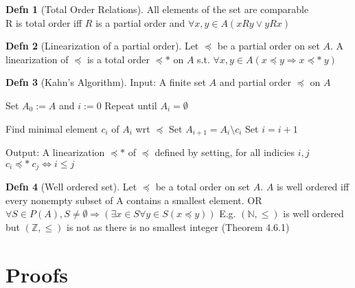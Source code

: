 \documentclass[a4paper]{article}
\theoremstyle{definition}
\newtheorem*{defn}{Defn}
\begin{document}
\begin{defn}[Total Order Relations] All elements of the set are comparable\\
  R is total order iff $R$ is a partial order and $\forall x, y \in A (xRy \lor yRx)$
\end{defn}

\begin{defn}[Linearization of a partial order]
  Let $\preccurlyeq$ be a partial order on set $A$. A linearization of $\preccurlyeq$ is a total order $\preccurlyeq *$ on $A$ s.t. $\forall x, y \in A (x \preccurlyeq y \Rightarrow x \preccurlyeq *\ y)$
\end{defn}

\begin{defn}[Kahn's Algorithm]
  Input: A finite set $A$ and partial order $\preccurlyeq$ on $A$
  \begin{numpf}
  \pfln Set $A_0 := A$ and $i := 0$
  \pfln Repeat until $A_i = \emptyset$
  \begin{subpf}
    \pfln Find minimal element $c_i$ of $A_i$ wrt $\preccurlyeq$ 
    \pfln Set $A_{i+1} = A_i \setminus {c_i}$
    \pfln Set $i = i+1$
  \end{subpf}
  \end{numpf}

  Output: A linearization $\preccurlyeq *$ of $\preccurlyeq$ defined by setting, for all indicies $i, j$\\ $c_i \preccurlyeq*\ c_j \Leftrightarrow i \leq j$
\end{defn}

\begin{defn}[Well ordered set] Let $\preccurlyeq$ be a total order on set $A$. $A$ is well ordered iff every nonempty subset of A contains a smallest element. OR\\
  $\forall S \in P(A), S \not = \emptyset \Rightarrow (\exists x \in S \forall y \in S (x \preccurlyeq y))$ E.g. $(\mathbb{N}, \leq)$ is well ordered but $(\mathbb{Z}, \leq)$ is not as there is no smallest integer (Theorem 4.6.1)

\end{defn}

\section{Proofs}
\end{document}
